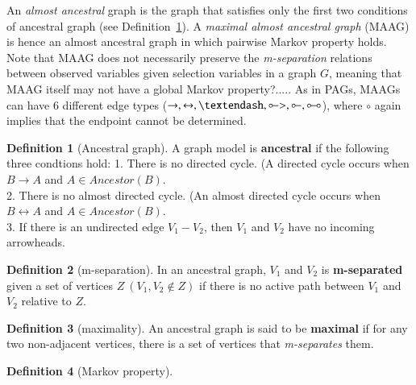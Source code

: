 \documentclass[11pt]{article}
\theoremstyle{definition}
\newtheorem{definition}{Definition}
\begin{document}
An \textit{almost ancestral} graph is the graph that satisfies only the first two conditions of ancestral graph (see Definition~\ref{def: def1}). A \textit{maximal almost ancestral graph} (MAAG) is hence an almost ancestral graph in which pairwise Markov property holds. Note that MAAG does not necessarily preserve the \textit{m-separation} relations between observed variables given selection variables in a graph $G$, meaning that MAAG itself may not have a global Markov property?..... As in PAGs, MAAGs can have 6 different edge types ($\rightarrow, \leftrightarrow, \textendash, \multimapinv>, \multimapinv, \multimapboth$), where $\circ$ again implies that the endpoint cannot be determined.


\begin{definition} [Ancestral graph] \label{def: def1}
A graph model is \textbf{ancestral} if the following three condtions hold:
1. There is no directed cycle. (A directed cycle occurs when $B \rightarrow A$ and $A \in Ancestor(B)$.\\
2. There is no almost directed cycle. (An almost directed cycle occurs when $B \leftrightarrow A$ and $A \in Ancestor(B)$.\\
3. If there is an undirected edge $V_1 - V_2$, then $V_1$ and $V_2$ have no incoming arrowheads.
\end{definition}

\begin{definition} [m-separation] \label{def: def2}
In an ancestral graph, $V_1$ and $V_2$ is \textbf{m-separated} given a set of vertices $Z\ (V_1, V_2 \notin Z)$ if there is no active path between $V_1$ and $V_2$ relative to $Z$. 
\end{definition}

\begin{definition} [maximality] \label{def: def3}
An ancestral graph is said to be \textbf{maximal} if for any two non-adjacent vertices, there is a set of vertices that \textit{m-separates} them.
\end{definition}

\begin{definition} [Markov property] \label{def: def4}


\end{definition}
\end{document}
